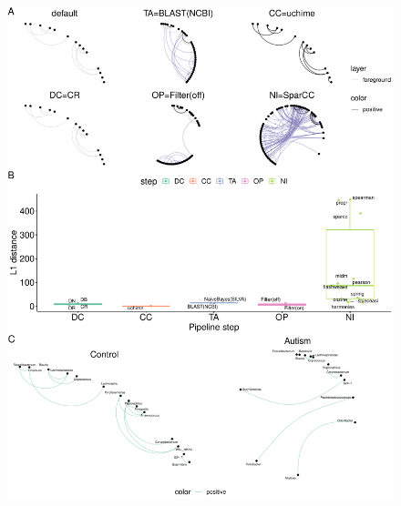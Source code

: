 \documentclass[letterpaper,12pt]{article}
\providecommand{\DIFdelbegin}{} %
\providecommand{\DIFaddbeginFL}{} %
\providecommand{\DIFaddendFL}{} %
\providecommand{\DIFdelbeginFL}{} %
\providecommand{\DIFdelendFL}{} %
\newcommand{\DIFscaledelfig}{0.5}
\newlength{\DIFdelgraphicswidth} %
\newlength{\DIFdelgraphicsheight} %
\newcommand{\DIFaddincludegraphics}[2][]{{\color{blue}\fbox{\DIFOincludegraphics[#1]{#2}}}} %
\newcommand{\DIFdelincludegraphics}[2][]{%
\sbox{\DIFdelgraphicsbox}{\DIFOincludegraphics[#1]{#2}}%
\settoboxwidth{\DIFdelgraphicswidth}{\DIFdelgraphicsbox} %
\settoboxtotalheight{\DIFdelgraphicsheight}{\DIFdelgraphicsbox} %
\scalebox{\DIFscaledelfig}{%
\parbox[b]{\DIFdelgraphicswidth}{\usebox{\DIFdelgraphicsbox}\\[-\baselineskip] \rule{\DIFdelgraphicswidth}{0em}}\llap{\resizebox{\DIFdelgraphicswidth}{\DIFdelgraphicsheight}{%
\setlength{\unitlength}{\DIFdelgraphicswidth}%
\begin{picture}(1,1)%
\thicklines\linethickness{2pt} %
{\color[rgb]{1,0,0}\put(0,0){\framebox(1,1){}}}%
{\color[rgb]{1,0,0}\put(0,0){\line( 1,1){1}}}%
{\color[rgb]{1,0,0}\put(0,1){\line(1,-1){1}}}%
\end{picture}%
}\hspace*{3pt}}} %
} %
\DeclareRobustCommand{\DIFdelbegin}{\DIFOdelbegin \let\includegraphics\DIFdelincludegraphics} %
\DeclareRobustCommand{\DIFaddbeginFL}{\DIFOaddbeginFL \let\includegraphics\DIFaddincludegraphics} %
\DeclareRobustCommand{\DIFaddendFL}{\DIFOaddendFL \let\includegraphics\DIFOincludegraphics} %
\DeclareRobustCommand{\DIFdelbeginFL}{\DIFOdelbeginFL \let\includegraphics\DIFdelincludegraphics} %
\DeclareRobustCommand{\DIFdelendFL}{\DIFOaddendFL \let\includegraphics\DIFOincludegraphics} %
\begin{document}
  \DIFdelbegin %
\DIFdelendFL \DIFaddbeginFL \FloatBarrier
  \newpage
  \begin{figure}[H]
    \DIFaddendFL \centering
    \DIFdelbeginFL %
\DIFdelendFL \DIFaddbeginFL \includegraphics[width=1.0\linewidth]{figure7.pdf}
  \end{figure}
\end{document}
